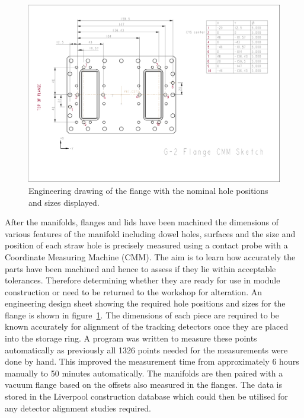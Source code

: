 \begin{figure}[ht]
\centering
\includegraphics[scale=0.3]{Figures/Flangedrawing.pdf}
\decoRule
\caption{Engineering drawing of the flange with the nominal hole positions and sizes displayed.}
\label{fig:Flangedrawing}
\end{figure}

After the manifolds, flanges and lids have been machined the dimensions of various features of the manifold including dowel holes, surfaces and the size and position of each straw hole is precisely measured using a contact probe with a Coordinate Measuring Machine (CMM). The aim is to learn how accurately the parts have been machined and hence to assess if they lie within acceptable tolerances. Therefore determining whether they are ready for use in module construction or need to be returned to the workshop for alteration. An engineering design sheet showing the required hole positions and sizes for the flange is shown in figure~\ref{fig:Flangedrawing}. The dimensions of each piece are required to be known accurately for alignment of the tracking detectors once they are placed into the storage ring. A program was written to measure these points automatically as previously all 1326 points needed for the measurements were done by hand. This improved the measurement time from approximately 6 hours manually to 50 minutes automatically. The manifolds are then paired with a vacuum flange based on the offsets also measured in the flanges. The data is stored in the Liverpool construction database which could then be utilised for any detector alignment studies required.

